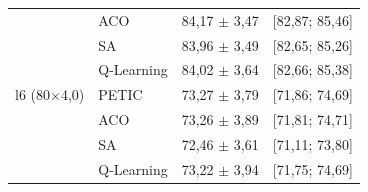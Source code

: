 \begin{table}[htb]
\begin{tabular}{llcc}
         & ACO & 84,17 $\pm$ 3,47 & [82,87; 85,46] \\
         & SA & 83,96 $\pm$ 3,49 & [82,65; 85,26] \\
         & Q-Learning & 84,02 $\pm$ 3,64 & [82,66; 85,38] \\
        \hline
        l6 (80$\times$4,0) & PETIC & 73,27 $\pm$ 3,79 & [71,86; 74,69] \\
         & ACO & 73,26 $\pm$ 3,89 & [71,81; 74,71] \\
         & SA & 72,46 $\pm$ 3,61 & [71,11; 73,80] \\
         & Q-Learning & 73,22 $\pm$ 3,94 & [71,75; 74,69] \\
        \hline
    \end{tabular}
\end{table}
